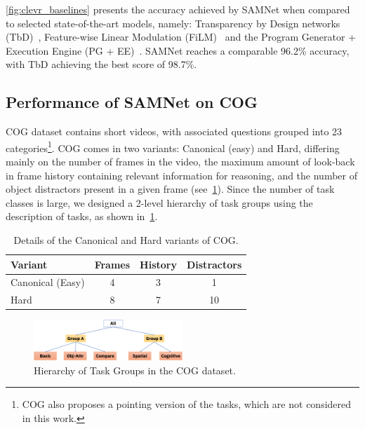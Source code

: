 \cref{fig:clevr_baselines} presents the accuracy achieved by SAMNet when compared to selected state-of-the-art models, namely: Transparency by Design networks (TbD)~\cite{mascharka2018transparency}, Feature-wise Linear Modulation (FiLM)~\cite{perez2018film} and the Program Generator + Execution Engine (PG + EE)~\cite{johnson2017inferring}.
SAMNet reaches a comparable 96.2\% accuracy, with TbD achieving the best score of 98.7\%.


\subsection{Performance of SAMNet on COG}
\label{sec:cog-baseline-compare}

COG dataset contains short videos, with associated questions grouped into 23 categories\footnote{COG also proposes a pointing version of the tasks, which are not considered in this work.}.
COG comes in two variants: Canonical (easy) and Hard, differing mainly on the number of frames in the video, the maximum amount of look-back in frame history containing relevant information for reasoning, and the number of object distractors present in a given frame (see~\cref{tab:cog_variants}).
Since the number of task classes is large, we designed a 2-level hierarchy of task groups using the
description of tasks, as shown in~\cref{fig:task-groups}.

\begin{table}[htbp]
	\centering
	\begin{tabular}{lccc}
		\toprule
		Variant	& Frames & History	& Distractors \\
		\midrule
		Canonical (Easy) & 4 & 3 & 1\\
		Hard  & 8 & 7 & 10\\
		\bottomrule
	\end{tabular}
	\caption{Details of the Canonical and Hard variants of COG.}
	\label{tab:cog_variants}
\end{table}


\begin{figure}[b!]
	\centering
	\includegraphics[width=0.5\textwidth]{../img/architecture/hierarchy}
	\caption{Hierarchy of Task Groups in the COG dataset.}
	\label{fig:task-groups}
\end{figure}



